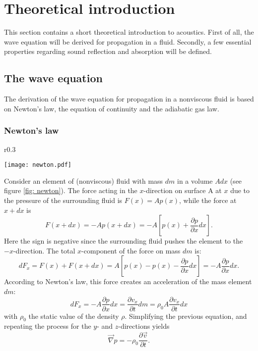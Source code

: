 \section{Theoretical introduction}
This section contains a short theoretical introduction to acoustics. First of all, the wave equation will be derived for propagation in a fluid. Secondly, a few essential properties regarding sound reflection and absorption will be defined. 



\subsection{The wave equation}
The derivation of the wave equation for propagation in a nonviscous fluid is based on Newton's law, the equation of continuity and the adiabatic gas law.



\subsubsection*{Newton's law}

\begin{wrapfigure}{r}{0.3\textwidth}
	\vspace{-60pt}
  \begin{center}
    \texttt{[image: newton.pdf]}
  \end{center}
   \vspace{-20pt}
  \caption{}\label{fig: newton}
  \vspace{-20pt}
\end{wrapfigure}

Consider an element of (nonviscous) fluid with mass $dm$ in a volume $A dx$ (see figure \ref{fig: newton}). The force acting in the $x$-direction on surface A at $x$ due to the pressure of the surrounding fluid  is $F(x) = A p(x) $, while the force at $x +dx$ is 
\[
F(x+dx) = - A p(x+dx) = -A [p(x) + \frac{\partial p}{\partial x} dx].
\]
Here the sign is negative since the surrounding fluid pushes the element to the $-x$-direction.
The total $x$-component of the force on mass $dm$ is:
\[
dF_x = F(x) + F(x+dx) = A \left[p(x) - p(x) - \frac{\partial p}{\partial x} dx\right] = - A \frac{\partial p}{\partial x} dx.
\]  
According to Newton's law, this force creates an acceleration of the mass element $dm$:
\[
dF_x = - A \frac{\partial p}{\partial x} dx = \frac{\partial v_x}{\partial t} dm = \rho_0 A \frac{\partial v_x}{\partial t} dx
\]
with $\rho_0$ the static value of the density $\rho$. Simplifying the previous equation, and repeating the process for the $y$- and $z$-directions yields
\begin{equation}
\vec{\nabla} p = - \rho_0 \frac{\partial \vec{v}}{\partial t}.
\label{newt}
\end{equation}


